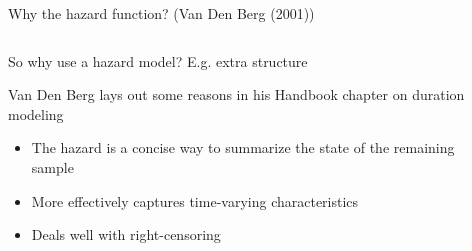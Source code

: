 \documentclass[notes,11pt, aspectratio=169]{beamer}
\newenvironment{wideitemize}{\itemize\addtolength{\itemsep}{10pt}}{\enditemize}
\begin{document}
\begin{frame}{Why the hazard function? (Van Den Berg (2001))}
    \begin{columns}[T] %
    \begin{column}{.4\textwidth}
      \begin{wideitemize}
      \item<1-> So why use a hazard model? E.g. extra structure
      \item<1-> Van Den Berg lays out some reasons in his Handbook chapter
        on duration modeling
        \begin{itemize}
        \item<1-> The hazard is a concise way to summarize the state
          of the remaining sample
        \item<2-> More effectively captures time-varying characteristics
        \item<2-> Deals well with right-censoring
        \end{itemize}
        \end{wideitemize}
    \end{column}%
  \hfill%
  \begin{column}{.6\textwidth}
    \begin{center}
    \end{center}
  \end{column}
\end{columns}
\end{frame}
\end{document}
